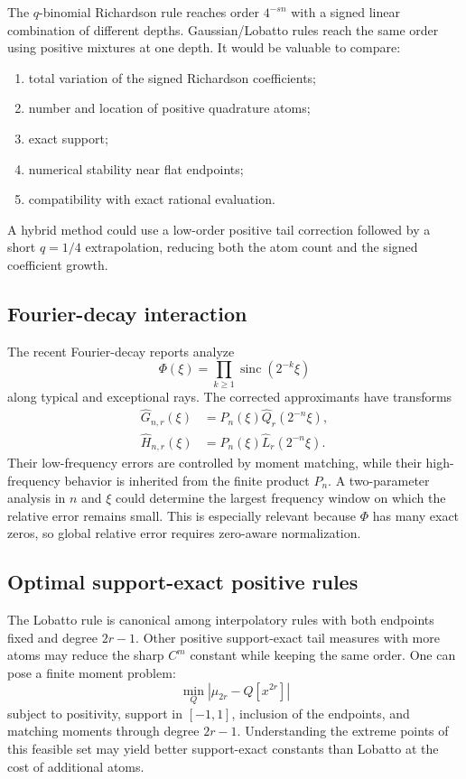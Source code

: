 \documentclass[11pt]{article}
\numberwithin{equation}{section}
\theoremstyle{definition}
\theoremstyle{remark}
\newcommand{\sinc}{\operatorname{sinc}}
\newcommand{\abs}[1]{\left|#1\right|}
\begin{document}
The $q$-binomial Richardson rule reaches order $4^{-sn}$ with a signed linear combination of different depths.  Gaussian/Lobatto rules reach the same order using positive mixtures at one depth.  It would be valuable to compare:
\begin{enumerate}
\item total variation of the signed Richardson coefficients;
\item number and location of positive quadrature atoms;
\item exact support;
\item numerical stability near flat endpoints;
\item compatibility with exact rational evaluation.
\end{enumerate}
A hybrid method could use a low-order positive tail correction followed by a short $q=1/4$ extrapolation, reducing both the atom count and the signed coefficient growth.

\subsection{Fourier-decay interaction}

The recent Fourier-decay reports analyze
\[
 \Phi(\xi)=\prod_{k\ge1}\sinc(2^{-k}\xi)
\]
along typical and exceptional rays.  The corrected approximants have transforms
\begin{align}
 \widehat G_{n,r}(\xi)&=P_n(\xi)\widehat Q_r(2^{-n}\xi),\label{eq:G-Fourier}\\
 \widehat H_{n,r}(\xi)&=P_n(\xi)\widehat L_r(2^{-n}\xi).
 \label{eq:H-Fourier}
\end{align}
Their low-frequency errors are controlled by moment matching, while their high-frequency behavior is inherited from the finite product $P_n$.  A two-parameter analysis in $n$ and $\xi$ could determine the largest frequency window on which the relative error remains small.  This is especially relevant because $\Phi$ has many exact zeros, so global relative error requires zero-aware normalization.

\subsection{Optimal support-exact positive rules}

The Lobatto rule is canonical among interpolatory rules with both endpoints fixed and degree $2r-1$.  Other positive support-exact tail measures with more atoms may reduce the sharp $C^m$ constant while keeping the same order.  One can pose a finite moment problem:
\begin{equation}
 \min_Q \abs{\mu_{2r}-Q[x^{2r}]}
 \label{eq:moment-optimization}
\end{equation}
subject to positivity, support in $[-1,1]$, inclusion of the endpoints, and matching moments through degree $2r-1$.  Understanding the extreme points of this feasible set may yield better support-exact constants than Lobatto at the cost of additional atoms.
\end{document}
